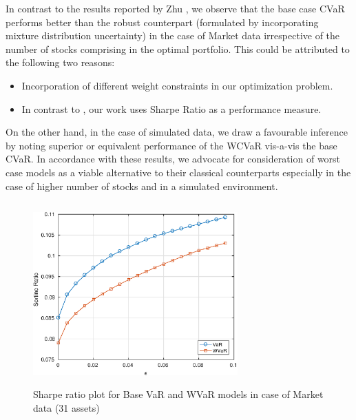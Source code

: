 \documentclass[12pt]{article}
\numberwithin{equation}{section}
\begin{document}
In contrast to the results reported by Zhu \cite{zhu}, we observe that the base case CVaR performs better than the robust counterpart (formulated by incorporating mixture distribution uncertainty) in the case of Market data irrespective of the number of stocks comprising in the optimal portfolio. This could be attributed to the following two reasons:
\begin{itemize}
\item Incorporation of different weight constraints in our optimization problem.
\item In contrast to \cite{zhu}, our work uses Sharpe Ratio as a performance measure.
\end{itemize}
On the other hand, in the case of simulated data, we draw a favourable inference by noting superior or equivalent performance of the WCVaR vis-a-vis the base CVaR. In accordance with these results, we advocate for consideration of worst case models as a viable alternative to their classical counterparts especially in the case of higher number of stocks and in a simulated environment.




\newpage

\begin{figure}[!h]
\centering
\includegraphics[height=7.0cm,width=0.7\textwidth]{VaR/bse30_market/sr_cheb.eps}
\caption{Sharpe ratio plot for Base VaR and WVaR models in case of Market data (31 assets)}
\label{fig:5.1}
\end{figure}
\end{document}
